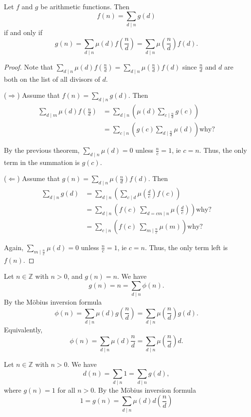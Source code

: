 \documentclass{ximera}
\begin{document}
\begin{theorem}
 Let $f$ and $g$ be arithmetic functions. Then \[f(n)=\displaystyle\sum_{d\mid n} g(d)\] if and only if \[g(n)=\displaystyle\sum_{d\mid n} \mu(d)f(\frac{n}{d})=\displaystyle\sum_{d\mid n} \mu(\frac{n}{d})f(d).\]
\end{theorem}
\begin{proof}
 Note that $\displaystyle\sum_{d\mid n} \mu(d)f(\frac{n}{d})=\displaystyle\sum_{d\mid n} \mu(\frac{n}{d})f(d)$ since $\frac{n}{d}$ and $d$ are both on the list of all divisors of $d$.
 
 ($\Rightarrow$) Assume that $f(n)=\displaystyle\sum_{d\mid n} g(d).$ Then 
\begin{align*}
 \displaystyle\sum_{d\mid m} \mu(d)f(\frac{n}{d})&=\displaystyle\sum_{d\mid n}\left(\mu(d) \displaystyle\sum_{c\mid \frac{n}{d}} g(c)\right)\\
 &=\displaystyle\sum_{c\mid n} \left(g(c)\displaystyle\sum_{d\mid\frac{n}{d}}\mu(d)\right) \textrm{why?}
\end{align*}

By the previous theorem, $\displaystyle\sum_{d\mid n}\mu(d)=0$ unless $\frac{n}{c}=1$, ie $c=n$. Thus, the only term in the summation is $g(c)$.

($\Leftarrow$) Assume that $g(n)=\displaystyle\sum_{d\mid n} \mu(\frac{n}{d})f(d).$ Then 
\begin{align*}
 \displaystyle\sum_{d\mid n} g(d)&= \displaystyle\sum_{d\mid n} \left( \displaystyle\sum_{c\mid d}\mu(\frac{d}{c})f(c)\right)\\
 &= \displaystyle\sum_{d\mid n} \left( f(c)\ \displaystyle\sum_{d=cm\mid n} \mu(\frac{d}{c})\right)\textrm{why?}\\
 &= \displaystyle\sum_{c\mid n} \left( f(c)\ \displaystyle\sum_{m\mid \frac{n}{c}} \mu(m)\right)\textrm{why?}
\end{align*}

Again, $\displaystyle\sum_{m\mid \frac{n}{c}}\mu(d)=0$ unless $\frac{n}{c}=1$, ie $c=n$. Thus, the only term left is $f(n)$.
\end{proof}

\begin{example}
Let $n\in\mathbb{Z}$ with $n>0$, and $g(n)=n$. We have \[g(n)=n=\displaystyle\sum_{d\mid n} \phi(n).\]  By the M\"obius inversion formula
\[\phi(n)=\displaystyle\sum_{d\mid n} \mu(d)g(\frac{n}{d})=\displaystyle\sum_{d\mid n} \mu(\frac{n}{d})g(d).\]
Equivalently, 
\[\phi(n)=\displaystyle\sum_{d\mid n} \mu(d)\frac{n}{d}=\displaystyle\sum_{d\mid n} \mu(\frac{n}{d})d.\]
\end{example}

\begin{example}
Let $n\in\mathbb{Z}$ with $n>0$. We have \[d(n)=\displaystyle\sum_{d\mid n} 1=\displaystyle\sum_{d\mid n} g(d),\] where $g(n)=1$ for all $n>0$. By the M\"obius inversion formula
\[1=g(n)=\displaystyle\sum_{d\mid n} \mu(d)d(\frac{n}{d})\]
\end{example}
\end{document}
